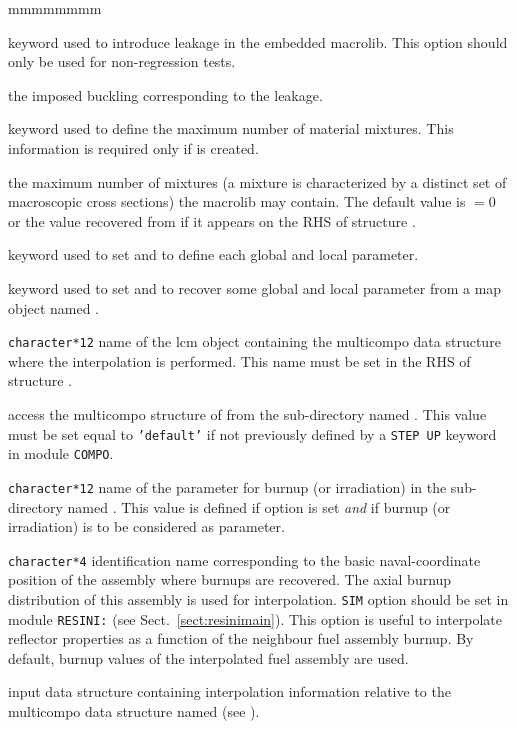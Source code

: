 \begin{ListeDeDescription}{mmmmmmmm}
\item[\moc{LEAK}] keyword used to introduce leakage in the embedded {\sc macrolib}. This option should only be used for non-regression tests.

\item[\dusa{b2}] the imposed buckling corresponding to the leakage.

\item[\moc{NMIX}] keyword used to define the maximum number of material mixtures. This information is required  only if  is created.

\item[\dusa{nmixt}] the maximum number of mixtures (a mixture is characterized by a distinct set of 
macroscopic cross sections) the {\sc macrolib} may contain. The default value is  $=0$ or the value recovered from  if it appears on
the RHS of structure .

\item[\moc{COMPO}] keyword used to set  and to define each global and local parameter.

\item[\moc{TABLE}] keyword used to set  and to recover some global and local parameter from a {\sc map} object named .

\item[\dusa{CPONAM}] {\tt character*12} name of the {\sc lcm} object containing the
{\sc multicompo} data structure where the interpolation is performed. This name must be set in the RHS of structure .

\item[\dusa{NAMDIR}] access the {\sc multicompo} structure of  from the sub-directory named .
This value must be set equal to {\tt 'default'} if not previously defined by a {\tt STEP UP} keyword in module {\tt COMPO}.

\item[\dusa{namburn}] {\tt character*12} name of the parameter for burnup (or irradiation) in the sub-directory named .
This value is defined if option  is set {\sl and} if burnup (or irradiation) is to be considered as parameter.

\item[\dusa{naval}] {\tt character*4} identification name corresponding to the basic naval-coordinate position of the assembly where burnups are recovered. The axial burnup distribution of this assembly is
used for interpolation. {\tt SIM} option should be set in module {\tt RESINI:} (see Sect.~\ref{sect:resinimain}). This option is useful to interpolate reflector properties as a function of the
neighbour fuel assembly burnup. By default, burnup values of the interpolated fuel assembly are used.

\item[\dusa{descintf}] input data structure containing interpolation information relative to the {\sc multicompo} data structure named  (see ).

\end{ListeDeDescription}

